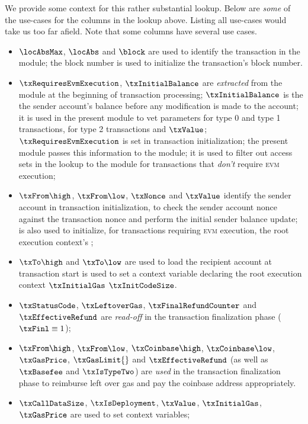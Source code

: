 \noindent We provide some context for this rather substantial lookup. Below are \emph{some} of the use-cases for the columns in the lookup above. Listing all use-cases would take us too far afield. Note that some columns have several use cases.
\begin{itemize}
	\item 
		$\locAbsMax$,
		$\locAbs$ and $\block$
		are used to identify the transaction in the \hubMod{} module;
		the block number is used to initialize the transaction's block number.
	\item 
		$\txRequiresEvmExecution$, $\txInitialBalance$ are \emph{extracted} from the \hubMod{} module at the beginning of transaction processing;
		$\txInitialBalance$ is the the sender account's balance before any modification is made to the account; it is used in the present module to vet  parameters for type 0 and type 1 transactions,  for type 2 transactions and $\txValue$;
		$\txRequiresEvmExecution$ is set in transaction initialization; the present module passes this information to the \rlpTxnMod{} module; it is used to filter out access sets in the lookup to the \hubMod{} module for transactions that \emph{don't} require \textsc{evm} execution; 
	\item
		$\txFrom\high$, $\txFrom\low$,
		$\txNonce$ and $\txValue$
		identify the sender account in transaction initialization, to check the sender account nonce \accNonce{} against the transaction nonce \txNonce{} and perform the initial sender balance update;  is also used to initialize, for transactions requiring \textsc{evm} execution, the root execution context's \cnCallValue{};
	\item
		$\txTo\high$ and $\txTo\low$ are used to load the recipient account at transaction start
		 is used to set a context variable declaring the root execution context 
		$\txInitialGas$
		$\txInitCodeSize$.
	\item 
		$\txStatusCode$,
		$\txLeftoverGas$,
		$\txFinalRefundCounter$ and
		$\txEffectiveRefund$ are \emph{read-off} in the transaction finalization phase ($\txFinl \equiv 1$);
	\item 
		$\txFrom\high$, $\txFrom\low$,
		$\txCoinbase\high$, $\txCoinbase\low$,
		$\txGasPrice$, 
		$\txGasLimit{}$ and
		$\txEffectiveRefund$
		(as well as $\txBasefee$ and $\txIsTypeTwo$) are \emph{used} in the transaction finalization phase to reimburse left over gas and pay the coinbase address appropriately.
	\item
		$\txCallDataSize$, $\txIsDeployment$, $\txValue$, $\txInitialGas$, $\txGasPrice$ are used to set context variables;
\end{itemize}
